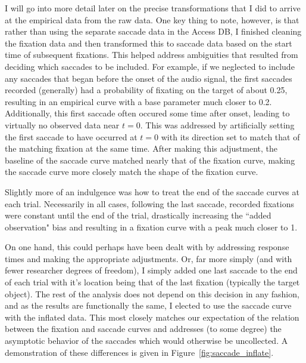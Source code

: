 \documentclass{article}
\begin{document}
I will go into more detail later on the precise transformations that I did to arrive at the empirical data from the raw data.  One key thing to note, however, is that rather than using the separate saccade data in the Access DB, I finished cleaning the fixation data and then transformed this to saccade data based on the start time of subsequent fixations. This helped address ambiguities that resulted from deciding which saccades to be included. For example, if we neglected to include any saccades that began before the onset of the audio signal, the first saccades recorded (generally) had a probability of fixating on the target of about 0.25, resulting in an empirical curve with a base parameter much closer to 0.2. Additionally, this first saccade often occured some time after onset, leading to virtually no observed data near $t = 0$. This was addressed by artificially setting the first saccade to have occurred at $t = 0$ with its direction set to match that of the matching fixation at the same time. After making this adjustment, the baseline of the saccade curve matched nearly that of the fixation curve, making the saccade curve more closely match the shape of the fixation curve.

Slightly more of an indulgence was how to treat the end of the saccade curves at each trial. Necessarily in all cases, following the last saccade, recorded fixations were constant until the end of the trial, drastically increasing the ``added observation" bias and resulting in a fixation curve with a peak much closer to 1.

On one hand, this could perhaps have been dealt with by addressing response times and making the appropriate adjustments. Or, far more simply (and with fewer researcher degrees of freedom), I simply added one last saccade to the end of each trial with it's location being that of the last fixation (typically the target object). The rest of the analysis does not depend on this decision in any fashion, and as the results are functionally the same, I elected to use the saccade curve with the inflated data. This most closely matches our expectation of the relation between the fixation and saccade curves and addresses (to some degree) the asymptotic behavior of the saccades which would otherwise be uncollected. A demonstration of these differences is given in Figure~\ref{fig:saccade_inflate}.
\end{document}
